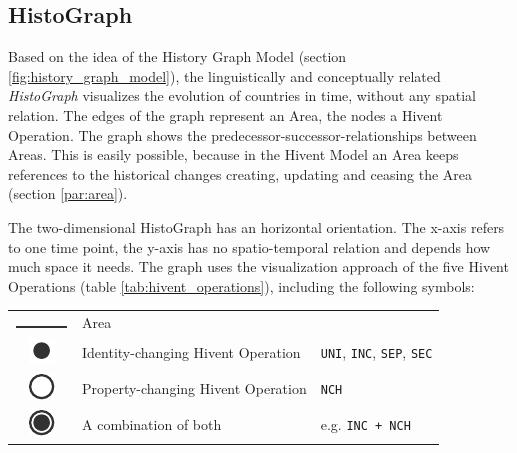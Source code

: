 
\subsection{HistoGraph} %
\label{sub:histograph}

Based on the idea of the History Graph Model (section \ref{fig:history_graph_model}), the linguistically and conceptually related \emph{HistoGraph} visualizes the evolution of countries in time, without any spatial relation. The edges of the graph represent an Area, the nodes a Hivent Operation. The graph shows the predecessor-successor-relationships between Areas. This is easily possible, because in the Hivent Model an Area keeps references to the historical changes creating, updating and ceasing the Area (section \ref{par:area}).

The two-dimensional HistoGraph has an horizontal orientation. The x-axis refers to one time point, the y-axis has no spatio-temporal relation and depends how much space it needs. The graph uses the visualization approach of the five Hivent Operations (table \ref{tab:hivent_operations}), including the following symbols:

\begin{table}[H]
\begin{center}
\begin{tabular}{c l l}

  \raisebox{3.5\height}
  {\includegraphics{graphics/development/hivent_model/histograph/line}}
  & Area
  & \\

  \raisebox{-0.2\height}
  {\includegraphics{graphics/development/hivent_model/histograph/circle_filled}}
  & Identity-changing Hivent Operation
  & \texttt{UNI}, \texttt{INC}, \texttt{SEP}, \texttt{SEC} \\

  \raisebox{-0.2\height}
  {\includegraphics{graphics/development/hivent_model/histograph/circle_unfilled}}
  & Property-changing Hivent Operation
  & \texttt{NCH} \\

  \raisebox{-0.2\height}
  {\includegraphics{graphics/development/hivent_model/histograph/circle_combo}}
  & A combination of both
  & e.g. \texttt{INC + NCH}

\end{tabular}
\label{tab:histograph_symbols}
\end{center}
\end{table}

